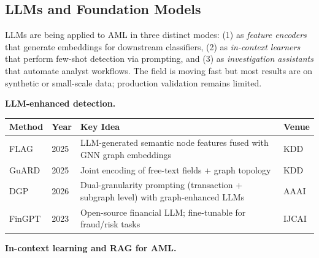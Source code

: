 \documentclass[11pt]{article}
\begin{document}
\subsection{LLMs and Foundation Models}

LLMs are being applied to AML in three distinct modes: (1) as \textit{feature encoders} that generate embeddings for downstream classifiers, (2) as \textit{in-context learners} that perform few-shot detection via prompting, and (3) as \textit{investigation assistants} that automate analyst workflows. The field is moving fast but most results are on synthetic or small-scale data; production validation remains limited.

\textbf{LLM-enhanced detection.}

\begin{center}
\small
\begin{tabular}{p{2.8cm}lp{4.5cm}l}
\toprule
\textbf{Method} & \textbf{Year} & \textbf{Key Idea} & \textbf{Venue} \\
\midrule
FLAG & 2025 & LLM-generated semantic node features fused with GNN graph embeddings & KDD \\
GuARD & 2025 & Joint encoding of free-text fields + graph topology & KDD \\
DGP & 2026 & Dual-granularity prompting (transaction + subgraph level) with graph-enhanced LLMs & AAAI \\
FinGPT & 2023 & Open-source financial LLM; fine-tunable for fraud/risk tasks & IJCAI \\
\bottomrule
\end{tabular}
\end{center}

\textbf{In-context learning and RAG for AML.}
\end{document}

